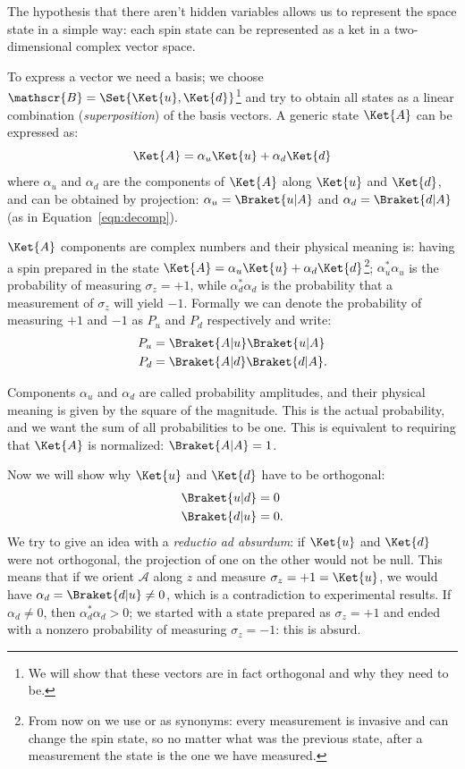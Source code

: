 The hypothesis that there aren't hidden variables allows us to represent the space state in a simple way: each spin state can be represented as a ket in a two-dimensional complex vector space.

To express a vector we need a basis; we choose $\mathscr{B}=\Set{\Ket{u}, \Ket{d}}$\footnote{We will show that these vectors are in fact orthogonal and why they need to be.} and try to obtain all states as a linear combination (\emph{superposition}) of the basis vectors. A generic state $\Ket{A}$ can be expressed as:
\[
\Ket{A} = \alpha_u \Ket{u} + \alpha_d\Ket{d}
\]
where $\alpha_u$ and $\alpha_d$ are the components of $\Ket{A}$ along $\Ket{u}$ and $\Ket{d}$, and can be obtained by projection: $\alpha_u = \Braket{u|A}$ and $\alpha_d = \Braket{d|A}$ (as in Equation~\ref{eqn:decomp}).

$\Ket{A}$ components are complex numbers and their physical meaning is: having a spin prepared in the state $\Ket{A} = \alpha_u \Ket{u} + \alpha_d\Ket{d}$\footnote{From now on we use  or  as synonyms: every measurement is invasive and can change the spin state, so no matter what was the previous state, after a measurement the state is the one we have measured.}; $\alpha_u^*\alpha_u$ is the probability of measuring $\sigma_z = +1$, while $\alpha_d^*\alpha_d$ is the probability that a measurement of $\sigma_z$ will yield $-1$. Formally we can denote the probability of measuring $+1$ and $-1$ as $P_u$ and $P_d$ respectively and write:
\begin{align}
	\label{eqn:prob_state}
	P_u &= \Braket{A|u}\Braket{u|A} \notag\\ 
	P_d &= \Braket{A|d}\Braket{d|A}.
\end{align}

Components $\alpha_u$ and $\alpha_d$ are called probability amplitudes, and their physical meaning is given by the square of the magnitude. This is the actual probability, and we want the sum of all probabilities to be one. This is equivalent to requiring that $\Ket{A}$ is normalized: $\Braket{A|A} = 1$.

Now we will show why $\Ket{u}$ and $\Ket{d}$ have to be orthogonal:
\begin{align*}
	\Braket{u|d}&= 0\\
	\Braket{d|u}&= 0.
\end{align*}
We try to give an idea with a \textit{reductio ad absurdum}: if $\Ket{u}$ and $\Ket{d}$ were not orthogonal, the projection of one on the other would not be null. This means that if we orient $\mathcal{A}$ along $z$ and measure $\sigma_z = +1 = \Ket{u}$, we would have $\alpha_d = \Braket{d|u} \neq 0$, which is a contradiction to experimental results. If $\alpha_d \neq 0$, then $\alpha_d^*\alpha_d > 0$; we started with a state prepared as $\sigma_z = +1$ and ended with a nonzero probability of measuring $\sigma_z = -1$: this is absurd.

